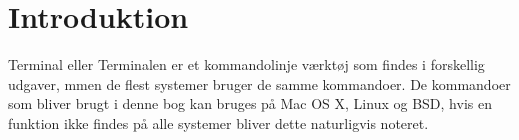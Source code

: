 \chapter{Introduktion}
Terminal eller Terminalen er et kommandolinje værktøj som findes i forskellig udgaver, mmen de flest systemer bruger de samme kommandoer. De kommandoer som bliver brugt i denne bog kan bruges på Mac OS X, Linux og BSD, hvis en funktion ikke findes på alle systemer bliver dette naturligvis noteret.
